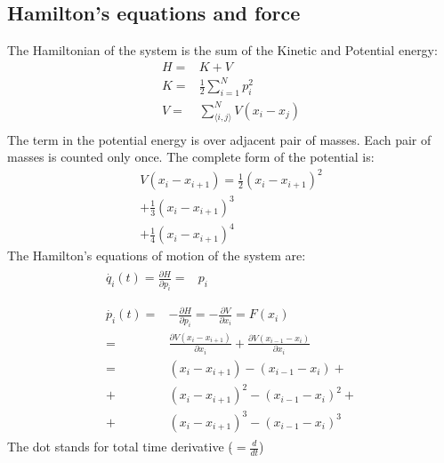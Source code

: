\documentclass[12pt,a4paper,twocolumn]{article}
\begin{document}
\subsection{Hamilton's equations and force}
The Hamiltonian of the system is the sum of the Kinetic and Potential energy:
\begin{equation}
\begin{split}
	H=&K+V\\
	K=&\frac{1}{2}\sum_{i=1}^N p_i^2\\
	V=&\sum_{\langle i,j \rangle}^N V(x_i-x_j)\\
\end{split}
\end{equation}
The term in the potential energy is over adjacent pair of masses. Each pair of masses is counted only once. The complete form of the potential is:
\begin{equation}
\begin{split}
	V(x_i-x_{i+1})=\frac{1}{2}(x_i-x_{i+1})^2\\
	+\frac{1}{3}(x_i-x_{i+1})^3\\
	+\frac{1}{4}(x_i-x_{i+1})^4
\end{split}
\end{equation}
The Hamilton's equations of motion of the system are:
\begin{align}
\begin{split}\label{eq:1}
	\dot{q_i}(t)= \frac{\partial H}{\partial p_i}= {} & p_i\\
\end{split}\\
\begin{split}\label{eq:2}
\dot{p_i}(t)= {} &-\frac{\partial H}{\partial p_i}=-\frac{\partial V}{\partial x_i}=F(x_i)\\
={}&\frac{\partial V(x_i-x_{i+1})}{\partial x_i}+\frac{\partial V (x_{i-1}-x_i)}{\partial x_i}\\
={}&(x_i-x_{i+1})-(x_{i-1}-x_i)+\\
+{}&(x_i-x_{i+1})^2-(x_{i-1}-x_i)^2+\\ 
+{}&(x_i-x_{i+1})^3-(x_{i-1}-x_i)^3
\end{split}
\end{align}
The dot stands for total time derivative ($\dot{}=\frac{d}{dt}$)
\end{document}

